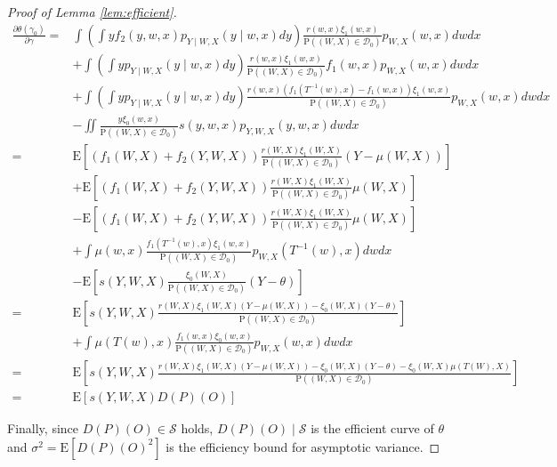 \documentclass[11pt]{article}
\def\P{{\mathrm P}}
\def\E{{\mathrm E}}
\numberwithin{equation}{section}
\theoremstyle{definition}
\begin{document}
\begin{proof}[Proof of Lemma \ref{lem:efficient}]
\begin{align*}
\frac{\partial \theta\left(\gamma_{0}\right)}{\partial \gamma}= & \int\left(\int yf_2(y,w,x)p_{Y\mid W,X}(y\mid w,x)dy\right)\frac{r(w,x)\xi_1(w,x)}{\P((W,X)\in\mathcal{D}_0)}p_{W,X}(w,x)dwdx\\
&+\int\left(\int yp_{Y\mid W,X}(y\mid w,x)dy\right)\frac{r(w,x)\xi_1(w,x)}{\P((W,X)\in\mathcal{D}_0)}f_1(w,x)p_{W,X}(w,x)dwdx\\
&+\int\left(\int yp_{Y\mid W,X}(y\mid w,x)dy\right)\frac{r(w,x)(f_1(T^{-1}(w),x)-f_1(w,x))\xi_1(w,x)}{\P((W,X)\in\mathcal{D}_0)}p_{W,X}(w,x)dwdx\\
&-\iint\frac{y\xi_0(w,x)}{\P((W,X)\in\mathcal{D}_0)} s(y,w,x)p_{Y,W,X}(y,w,x) dwdx\\
=&\E[(f_1(W,X)+f_2(Y,W,X))\frac{r(W,X)\xi_1(W,X)}{\P((W,X)\in\mathcal{D}_0)}(Y-\mu(W,X))]\\
&+\E[(f_1(W,X)+f_2(Y,W,X))\frac{r(W,X)\xi_1(W,X)}{\P((W,X)\in\mathcal{D}_0)}\mu(W,X)]\\
&-\E[(f_1(W,X)+f_2(Y,W,X))\frac{r(W,X)\xi_1(W,X)}{\P((W,X)\in\mathcal{D}_0)}\mu(W,X)]\\
&+\int\mu(w,x)\frac{f_1(T^{-1}(w),x)\xi_1(w,x)}{\P((W,X)\in\mathcal{D}_0)}p_{W,X}(T^{-1}(w),x)dwdx\\
&-\E[s(Y,W,X)\frac{\xi_0(W,X)}{\P((W,X)\in\mathcal{D}_0)}(Y-\theta)]\\
=&\E\left[s(Y,W,X)\frac{r(W,X)\xi_1(W,X)(Y-\mu(W,X))-\xi_0(W,X)(Y-\theta)}{\P((W,X)\in\mathcal{D}_0)}\right]\\
&+\int\mu(T(w),x)\frac{f_1(w,x)\xi_0(w,x)}{\P((W,X)\in\mathcal{D}_0)}p_{W,X}(w,x)dwdx\\
=&\E\left[s(Y,W,X)\frac{r(W,X)\xi_1(W,X)(Y-\mu(W,X))-\xi_0(W,X)(Y-\theta)-\xi_0(W,X)\mu(T(W),X)}{\P((W,X)\in\mathcal{D}_0)}\right]\\
=&\E\left[s(Y,W,X)D(P)(O)\right]
\end{align*}

Finally, since $D(P)(O)\in\mathscr{S}$ holds, $D(P)(O)\mid\mathcal{S}$ is the efficient curve of $\theta$ and $\sigma^2=\E[D(P)(O)^2]$ is the efficiency bound for asymptotic variance.
\end{proof}
\end{document}
